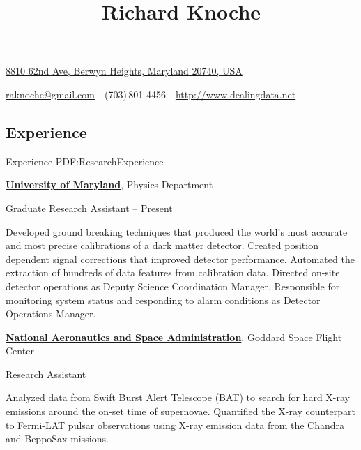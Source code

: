 \documentclass[letterpaper,MMMyyyy,nonstop]{simpleresumecv}
\newcommand{\CVAuthor}{Richard Knoche}
\newcommand{\CVWebpage}{http://www.dealingdata.net}
\begin{document}

\title{\CVAuthor}

\begin{subtitle}
\href{https://www.google.com/maps/place/8810+62nd+Ave,+Berwyn+Heights,+MD+20740/@38.995313,-76.908195,17z/data=!3m1!4b1!4m5!3m4!1s0x89b7c3fd69c6911b:0xa23453a69afa6fc8!8m2!3d38.995313!4d-76.908195}
{8810 62nd Ave, Berwyn Heights, Maryland 20740, USA}
\par
\href{mailto:raknoche@gmail.com}
{raknoche@gmail.com}
\,\SubBulletSymbol\,
(703)\,801-4456
\,\SubBulletSymbol\,
\href{\CVWebpage}
{\CVWebpage}
\end{subtitle}

\begin{body}


\section
{Experience}
{Experience}
{PDF:ResearchExperience}

\href{http://umdphysics.umd.edu/}
{\textbf{University of Maryland}},
Physics Department

\GapNoBreak
\BulletItem
Graduate Research Assistant
\hfill
{} -- Present

\begin{detail}
\SubBulletItem
Developed ground breaking techniques that produced the world's most accurate and most precise calibrations of a dark matter detector.
\SubBulletItem
Created position dependent signal corrections that improved detector performance.
\SubBulletItem
Automated the extraction of hundreds of data features from calibration data.
\SubBulletItem
Directed on-site detector operations as Deputy Science Coordination Manager.
\SubBulletItem
Responsible for monitoring system status and responding to alarm conditions as Detector Operations Manager.
\end{detail}

\BigGap
\href{http://csma31.csm.jmu.edu/physics/}
{\textbf{National Aeronautics and Space Administration}},
Goddard Space Flight Center

\GapNoBreak
\BulletItem
Research Assistant
\hfill
{}

\begin{detail}
\SubBulletItem
Analyzed data from Swift Burst Alert Telescope (BAT) to search for hard X-ray emissions around the on-set time of supernovae.
\SubBulletItem
Quantified the X-ray counterpart to Fermi-LAT pulsar observations using X-ray emission data from the Chandra and BeppoSax missions.
\end{detail}


\end{body}
\end{document}

